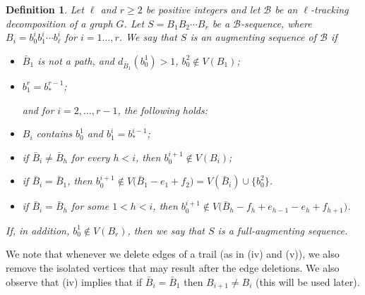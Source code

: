 \documentclass[12pt,reqno,a4paper]{amsart}
\newtheorem{definition}[theorem]{Definition}
\newcommand{\B}{\mathcal{B}}
\newcommand{\full}{full}
\begin{document}

\begin{definition}\label{def:augmenting}
Let \(\ell\) and $r\geq 2$ be positive integers 
and let \(\B\) be an \(\ell\)-tracking decomposition of a graph \(G\).
Let \(S = B_1B_2\cdots B_r\) be a \(\mathcal{B}\)-sequence,
where \(B_i=b_0^ib_1^i\cdots b_\ell^i\) for $i=1\ldots,r$. We say that 
\(S\) is an \emph{augmenting sequence} of $\B$ if 
\begin{itemize}
	\item[(i1)] \(\bar B_1\) is not a path, and $d_{\bar B_1}(b_0^1) >
          1$, $b_0^2\notin V(B_1)$;
        \item[(i2)] \(b_1^r = b_*^{r-1}\);

	\hspace*{-1.9cm}and for $i=2,\ldots, r-1$, the following
        holds:

	\item[(ii)] $B_i$ contains $b_0^1$  and \(b_1^{i} = b_*^{i-1}\);
	\item[(iii)] if \(\bar B_{i} \neq \bar B_{h}\)
	for every \(h< i\), then \(b_0^{i+1}\notin V(B_i)\);
	\item[(iv)] if \(\bar B_i = \bar B_{1}\), then
          $b_0^{i+1}\notin V\big(\bar B_1 - e_1 + f_2\big) = V(\bar B_i) \cup \{b_0^2\}$. 
         
	\item[(v)] if \(\bar B_{i} = \bar B_{h}\) for some $1<h<i$, 
	then \(b_0^{i+1}\notin V(\bar B_h - f_h + e_{h-1} - e_h+ f_{h+1}\big)\).
\end{itemize}
If, in addition, \(b_0^1 \notin V(B_r)\), then we say that \(S\) is a 
\emph{\full-augmenting sequence}. 
\end{definition}





We note that whenever we delete edges of a trail (as in (iv) and (v)), we also
remove the isolated vertices that may result after the edge deletions.
We also observe that  (iv) implies that if $\bar B_i= \bar B_1$
  then $B_{i+1} \ne B_i$ (this will be used  later).
\end{document}
